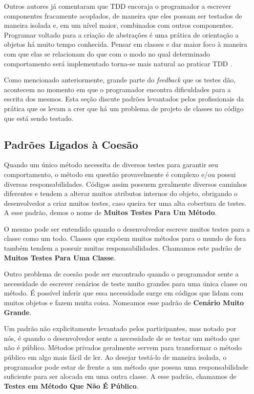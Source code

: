 Outros autores já comentaram que 
TDD encoraja o programador a escrever componentes fracamente acoplados, de
maneira que eles possam ser testados de maneira isolada e, em um nível maior,
combinados com outros componentes.
Programar voltado para a criação de abstrações é uma prática de orientação a objetos há muito
tempo conhecida. Pensar em classes e dar maior foco à maneira com que
elas se relacionam do que com o modo no qual determinado comportamento será implementado
torna-se mais natural ao praticar TDD \cite{GOOS}. 

Como mencionado anteriormente, grande parte do \textit{feedback} que os testes
dão, acontecem no momento em que o programador encontra dificuldades para a
escrita dos mesmos. Esta seção discute padrões levantados pelos profissionais da prática
que os levam a crer que há um problema de projeto de classes no código
que está sendo testado.

\subsection{Padrões Ligados à Coesão}

Quando um único método necessita de diversos testes para garantir seu comportamento,
o método em questão provavelmente é complexo e/ou possui diversas responsabilidades.
Códigos assim possuem geralmente diversos caminhos
diferentes e tendem a alterar muitos atributos internos do objeto, obrigando o desenvolvedor
a criar muitos testes, caso queira ter uma alta cobertura de testes.
A esse padrão, demos o nome de \textbf{Muitos Testes Para Um Método}.

O mesmo pode ser entendido quando o desenvolvedor escreve muitos testes para a 
classe como um todo. Classes que expõem muitos métodos para o mundo de fora
também tendem a possuir muitas responsabilidades. Chamamos este padrão
de \textbf{Muitos Testes Para Uma Classe}.

Outro problema de coesão pode ser encontrado quando o programador
sente a necessidade de escrever cenários de teste muito grandes para uma
única classe ou método. É possível inferir que essa necessidade surge 
em códigos que lidam com muitos objetos e fazem muita coisa. Nomeamos
esse padrão de \textbf{Cenário Muito Grande}.

Um padrão não explicitamente levantado pelos participantes, mas notado
por nós, é quando o desenvolvedor sente a necessidade de se testar
um método que não é público. Métodos privados geralmente servem para 
transformar o método público em algo mais fácil de ler. Ao desejar
testá-lo de maneira isolada, o programador pode estar de frente a
um método que possua uma responsabilidade suficiente para ser
alocada em uma outra classe. A esse padrão, chamamos de 
\textbf{Testes em Método Que Não É Público}.


